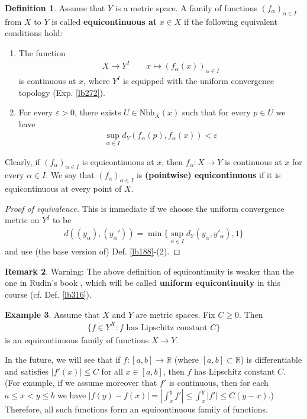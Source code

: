 \documentclass[12pt,b5paper,notitlepage]{article}
\theoremstyle{definition}
\newtheorem{df}{Definition}[section]
\newtheorem{eg}[df]{Example}
\newtheorem{rem}[df]{Remark}
\theoremstyle{plain}
\newcommand{\Rbb}{\mathbb R}
\newcommand{\Nbh}{\mathrm{Nbh}}
\newcommand{\eps}{\varepsilon}
\numberwithin{equation}{section}
\begin{document}
\begin{df}\label{lb514}
Assume that $Y$ is a metric space. A family of functions $(f_\alpha)_{\alpha\in I}$ from $X$ to $Y$ is called \textbf{equicontinuous at} $x\in X$  if the following equivalent conditions hold:
\begin{enumerate}[label=(\arabic*)]
\item The function
\begin{gather}
X\rightarrow Y^{I}\qquad x\mapsto (f_\alpha(x))_{\alpha\in I}
\end{gather}
is continuous at $x$, where $Y^{I}$ is equipped with the uniform convergence topology (Exp. \ref{lb272}).
\item For every $\eps>0$, there exists $U\in\Nbh_X(x)$ such that for every $p\in U$ we have
\begin{align*}
\sup_{\alpha\in I}d_Y(f_\alpha(p),f_\alpha(x))<\eps
\end{align*}
\end{enumerate}
Clearly, if $(f_\alpha)_{\alpha\in I}$ is equicontinuous at $x$, then $f_\alpha:X\rightarrow Y$ is continuous at $x$ for every $\alpha\in I$. We say that $(f_\alpha)_{\alpha\in I}$ is \textbf{(pointwise) equicontinuous}  if it is equicontinuous at every point of $X$.
\end{df}



\begin{proof}[Proof of equivalence]
This is immediate if we choose the uniform convergence metric on $Y^I$ to be
\begin{align*}
d((y_\alpha),(y_\alpha'))=\min\Big\{\sup_{\alpha\in I}d_Y(y_\alpha,y'_\alpha),1\Big\}
\end{align*}
and use (the base version of) Def. \ref{lb188}-(2).
\end{proof}

\begin{rem}
Warning: The above definition of equicontinuity is weaker than the one in Rudin's book \cite[Ch. 7]{Rud-P}, which will be called \textbf{uniform equicontinuity} in this course (cf. Def. \ref{lb316}).
\end{rem}



\begin{eg}\label{lb309}
Assume that $X$ and $Y$ are metric spaces. Fix $C\geq 0$. Then
\begin{align*}
\{f\in Y^X:f\text{ has Lipschitz constant }C\}
\end{align*}
is an equicontinuous family of functions $X\rightarrow Y$.

In the future, we will see that if $f:[a,b]\rightarrow\Rbb$ (where $[a,b]\subset\Rbb$) is differentiable and satisfies $|f'(x)|\leq C$ for all $x\in[a,b]$, then $f$ has Lipschitz constant $C$. (For example, if we assume moreover that $f'$ is continuous, then for each $a\leq x<y\leq b$ we have $|f(y)-f(x)|=|\int_x^y f'|\leq \int_x^y|f'|\leq C(y-x)$.) Therefore, all such functions form an equicontinuous family of functions.  \hfill\qedsymbol
\end{eg}
\end{document}
